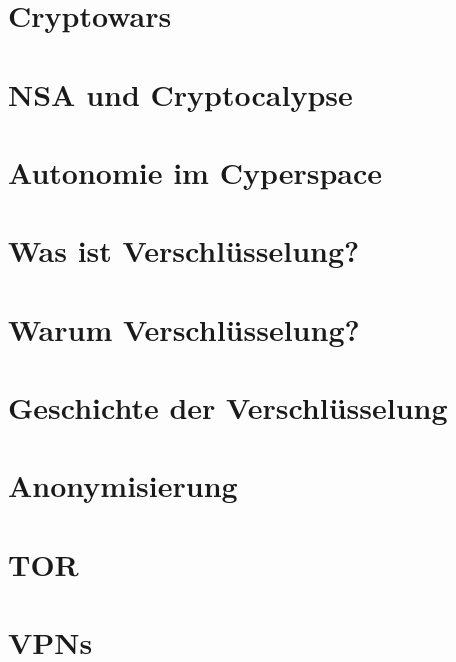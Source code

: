 \documentclass{beamer}
\begin{document}
\section{Cryptowars} 

\section{NSA und Cryptocalypse} 

\section{Autonomie im Cyperspace} 

\section{Was ist Verschlüsselung?} 
\section{Warum Verschlüsselung?} 
\section{Geschichte der Verschlüsselung} 

\section{Anonymisierung} 

\section{TOR} 
\section{VPNs} 
\end{document}
